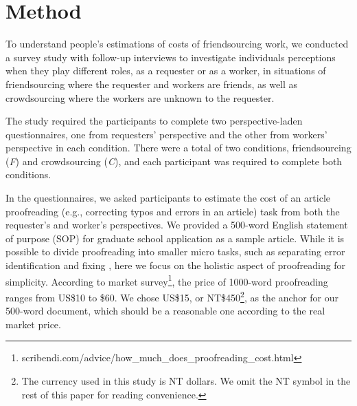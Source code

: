 \section{Method}


To understand people's estimations of costs of friendsourcing work, 
we conducted a survey study with follow-up interviews to investigate individuals perceptions when they play different roles, 
as a requester or as a worker, 
in situations of friendsourcing where the requester and workers are friends, 
as well as crowdsourcing where the workers are unknown to the requester.

The study required the participants to complete two perspective-laden questionnaires, 
one from requesters' perspective and the other from workers’ perspective in each condition. 
There were a total of two conditions,
friendsourcing (\emph{F}) and crowdsourcing (\emph{C}), and each participant was required to complete both conditions.

In the questionnaires, we asked participants to estimate the cost of an article proofreading 
(e.g., correcting typos and errors in an article) task from both the requester's and worker's perspectives. 
We provided a 500-word English statement of purpose (SOP) for graduate school application as a sample article. 
While it is possible to divide proofreading into smaller micro tasks, 
such as separating error identification and fixing \cite{Bernstein:UIST10:Soylent}, 
here we focus on the holistic aspect of proofreading for simplicity. 
According to market survey\footnote{scribendi.com/advice/how\_much\_does\_proofreading\_cost.html}, 
the price of 1000-word proofreading ranges from US\$10 to \$60. 
We chose US\$15, or NT\$450\footnote{The currency used in this study is NT dollars.
We omit the NT symbol in the rest of this paper for reading convenience.
},
 as the anchor for our 500-word document, which should be a reasonable one according to the real market price.

